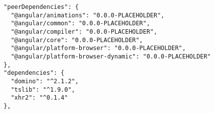 \begin{verbatim}
  "peerDependencies": {
    "@angular/animations": "0.0.0-PLACEHOLDER",
    "@angular/common": "0.0.0-PLACEHOLDER",
    "@angular/compiler": "0.0.0-PLACEHOLDER",
    "@angular/core": "0.0.0-PLACEHOLDER",
    "@angular/platform-browser": "0.0.0-PLACEHOLDER",
    "@angular/platform-browser-dynamic": "0.0.0-PLACEHOLDER"
  },
  "dependencies": {
    "domino": "^2.1.2",
    "tslib": "^1.9.0",
    "xhr2": "^0.1.4"
  },
\end{verbatim}
